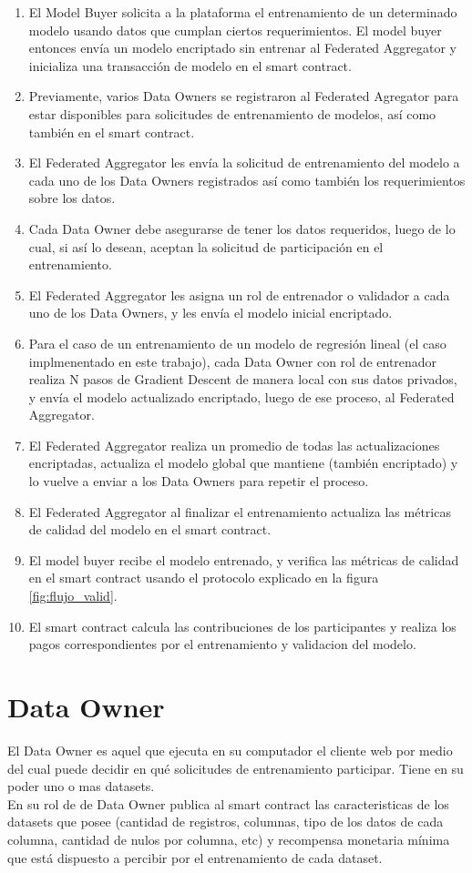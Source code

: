 \documentclass[
11pt, %
oneside, %
spanish, %
singlespacing, %
parskip, %
headsepline, %
chapterinoneline, %
]{MastersDoctoralThesis} %
\begin{document}
\begin{enumerate}
\item El Model Buyer solicita a la plataforma el entrenamiento de un determinado modelo usando datos que cumplan ciertos requerimientos. El model buyer entonces envía un modelo encriptado sin entrenar al Federated Aggregator y inicializa una transacción de modelo en el smart contract.
\item Previamente, varios Data Owners se registraron al Federated Agregator para estar disponibles para solicitudes de entrenamiento de modelos, así como también en el smart contract.
\item El Federated Aggregator les envía la solicitud de entrenamiento del modelo a cada uno de los Data Owners registrados así como también los requerimientos sobre los datos.
\item Cada Data Owner debe asegurarse de tener los datos requeridos, luego de lo cual, si así lo desean, aceptan la solicitud de participación en el entrenamiento.
\item El Federated Aggregator les asigna un rol de entrenador o validador a cada uno de los Data Owners, y les envía el modelo inicial encriptado.
\item Para el caso de un entrenamiento de un modelo de regresión lineal (el caso implmenentado en este trabajo), cada Data Owner con rol de entrenador realiza N pasos de Gradient Descent de manera local con sus datos privados, y envía el modelo actualizado encriptado, luego de ese proceso, al Federated Aggregator.
\item El Federated Aggregator realiza un promedio de todas las actualizaciones encriptadas, actualiza el modelo global que mantiene (también encriptado) y lo vuelve a enviar a los Data Owners para repetir el proceso.
\item El Federated Aggregator al finalizar el entrenamiento actualiza las métricas de calidad del modelo en el smart contract.
\item El model buyer recibe el modelo entrenado, y verifica las métricas de calidad en el smart contract usando el protocolo explicado en la figura \ref{fig:flujo_valid}.
\item El smart contract calcula las contribuciones de los participantes y realiza los pagos correspondientes por el entrenamiento y validacion del modelo.
\end{enumerate}


\section{Data Owner}
\justify
El Data Owner es aquel que ejecuta en su computador el cliente web por medio del cual puede decidir en qué solicitudes de entrenamiento participar. Tiene en su poder uno o mas datasets. \\
En su rol de de Data Owner publica al smart contract las caracteristicas de los datasets que posee (cantidad de registros, columnas, tipo de los datos de cada columna, cantidad de nulos por columna, etc) y recompensa monetaria mínima que está dispuesto a percibir por el entrenamiento de cada dataset.
\end{document}
